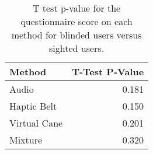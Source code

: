 
\begin{table}[!htb]
\centering
\caption{T test p-value for the questionnaire score on each method for blinded users versus sighted users.}
\label{tab:ttest_questionnaires}
\begin{tabular}{lr}
\toprule
      Method &  T-Test P-Value \\
\midrule
       Audio &           0.181 \\
 Haptic Belt &           0.150 \\
Virtual Cane &           0.201 \\
     Mixture &           0.320 \\
\bottomrule
\end{tabular}
\end{table}

